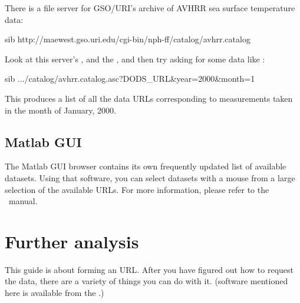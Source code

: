 \documentclass{dods-book}
\begin{document}
There is a file server for GSO/URI's archive of AVHRR sea surface
temperature data:

\begin{vcode}{sib}
http://maewest.gso.uri.edu/cgi-bin/nph-ff/catalog/avhrr.catalog
\end{vcode}

Look at this server's , and the , and then try asking
for some data like :

\begin{vcode}[http://maewest.gso.uri.edu/cgi-bin/nph-ff/catalog/avhrr.catalog.asc?DODS_URL&year=2000&month=1]{sib}
  .../catalog/avhrr.catalog.asc?DODS_URL&year=2000&month=1
\end{vcode}

This produces a list of all the data URLs corresponding to
measurements taken in the month of January, 2000.

\section{Matlab GUI}

The \opendap Matlab GUI browser contains its own frequently updated list of
available datasets.  Using that software, you can select datasets with
a mouse from a large selection of the available URLs.  For more
information, please refer to the \OPDmgui\ manual.

\chapter{Further analysis}

This guide is about forming an \opendap URL.  After you have figured out
how to request the data, there are a variety of things you can do with
it.  (\opendap software mentioned here is available from the \OPDhome .)

\end{document}
